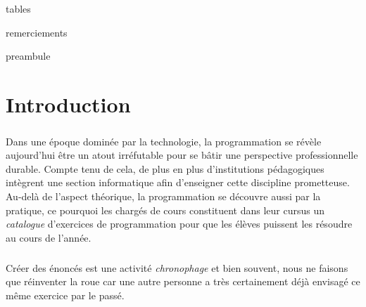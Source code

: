 


\frontmatter

{tables}

{remerciements}

{preambule}

\mainmatter


\chapter{Introduction}

\paragraph{} Dans une époque dominée par la technologie, la programmation se révèle aujourd’hui être un atout irréfutable pour se bâtir une perspective professionnelle durable. Compte tenu de cela, de plus en plus d’institutions pédagogiques intègrent une section informatique afin d’enseigner cette discipline prometteuse. Au-delà de l’aspect théorique, la programmation se découvre aussi par la pratique, ce pourquoi les chargés de cours constituent dans leur cursus un \textit{catalogue} d’exercices de programmation pour que les élèves puissent les résoudre au cours de l'année. 

\paragraph{} Créer des énoncés est une activité \textit{chronophage} et bien souvent, nous ne faisons que réinventer la roue car une autre personne a très certainement déjà envisagé ce même exercice par le passé.

